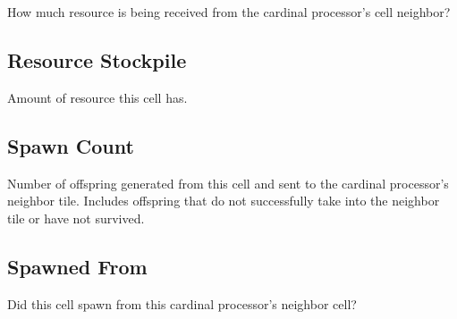 
How much resource is being received from the cardinal processor's cell neighbor?

\subsection{Resource Stockpile}


Amount of resource this cell has.

\subsection{Spawn Count}


Number of offspring generated from this cell and sent to the cardinal processor's neighbor tile.
Includes offspring that do not successfully take into the neighbor tile or have not survived.

\subsection{Spawned From}


Did this cell spawn from this cardinal processor's neighbor cell?
